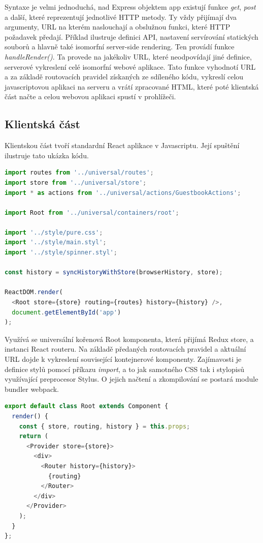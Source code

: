 Syntaxe je velmi jednoduchá, nad Express objektem app existují funkce \textit{get}, \textit{post} a další, které reprezentují jednotlivé HTTP metody. Ty vždy přijímají dva argumenty, URL na kterém naslouchají a obslužnou funkci, které HTTP požadavek předají. Příklad ilustruje definici API, nastavení servírování statických souborů a hlavně také isomorfní server-side rendering. Ten provádí funkce \textit{handleRender()}. Ta provede na jakékoliv URL, které neodpovídají jiné definice, serverové vykreslení celé isomorfní webové aplikace. Tato funkce vyhodnotí URL a za základě routovacích pravidel získaných ze sdíleného kódu, vykreslí celou javascriptovou aplikaci na serveru a vrátí zpracované HTML, které poté klientská část načte a celou webovou aplikaci spustí v prohlížeči.
\subsection{Klientská část}
Klientskou část tvoří standardní React aplikace v Javascriptu. Její spuštění ilustruje tato ukázka kódu.
\begin{lstlisting}[language=Javascript, caption={Ukázka klientské části isomorfní webové aplikace}]
import routes from '../universal/routes';
import store from '../universal/store';
import * as actions from '../universal/actions/GuestbookActions';

import Root from '../universal/containers/root';

import '../style/pure.css';
import '../style/main.styl';
import '../style/spinner.styl';

const history = syncHistoryWithStore(browserHistory, store);

ReactDOM.render(
  <Root store={store} routing={routes} history={history} />,
  document.getElementById('app')
);
\end{lstlisting}

Využívá se universální kořenová Root komponenta, která přijímá Redux store, a instanci React routeru. Na základě předaných routovacích pravidel a aktuální URL dojde k vykreslení související kontejnerové komponenty. Zajímavosti je definice stylů pomocí příkazu \textit{import}, a to jak samotného CSS tak i stylopisů využívající preprocesor Stylus. O jejich načtení a zkompilování se postará module bundler webpack.

\begin{lstlisting}[language=Javascript, caption={Ukázka implementace kořenové React komponenty}]
export default class Root extends Component {
  render() {
    const { store, routing, history } = this.props;
    return (
      <Provider store={store}>
        <div>
          <Router history={history}>
            {routing}
          </Router>
        </div>
      </Provider>
    );
  }
};
\end{lstlisting}

